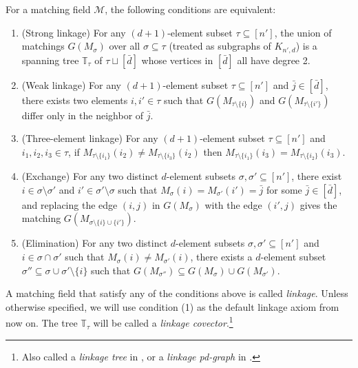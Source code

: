 \documentclass[letterpaper,reqno,11pt]{amsart}
\begin{document}
\begin{theorem}\label{thm:linkageequiv}
    For a matching field $\mathcal{M}$, the following conditions are equivalent: \begin{enumerate}
        \item \textnormal{(Strong linkage)} For any $(d+1)$-element subset $\tau\subseteq [n']$, the union of matchings $G(M_\sigma)$ over all $\sigma\subseteq \tau$ (treated as subgraphs of $K_{n', d}$) is a spanning tree $\mathbb{T}_{\tau}$ of $\tau \sqcup [\bar{d}]$ whose vertices in $[\bar{d}]$ all have degree 2.
        \item \textnormal{(Weak linkage)} For any $(d+1)$-element subset $\tau\subseteq [n']$ and $\bar{j}\in [\bar{d}]$, there exists two elements $i, i'\in \tau$ such that $G(M_{\tau\setminus \{i\}})$ and $G(M_{\tau\setminus \{i'\}})$ differ only in the neighbor of $\bar{j}$.
        \item \textnormal{(Three-element linkage)} For any $(d+1)$-element subset $\tau\subseteq [n']$ and $i_1, i_2, i_3\in \tau$, if $M_{\tau\setminus\{i_1\}}(i_2) \neq M_{\tau\setminus\{i_3\}}(i_2)$ then $M_{\tau\setminus\{i_1\}}(i_3) = M_{\tau\setminus\{i_2\}}(i_3)$.
        \item \textnormal{(Exchange)} For any two distinct $d$-element subsets $\sigma, \sigma'\subseteq [n']$, there exist $i\in \sigma\setminus\sigma'$ and $i'\in \sigma'\setminus \sigma$ such that $M_{\sigma}(i) = M_{\sigma'}(i') = \bar{j}$ for some $\bar{j}\in [\bar{d}]$, and replacing the edge $(i, j)$ in $G(M_\sigma)$ with the edge $(i', j)$ gives the matching $G(M_{\sigma\setminus\{i\}\cup \{i'\}})$.
        \item \textnormal{(Elimination)} For any two distinct $d$-element subsets $\sigma, \sigma'\subseteq [n']$ and $i\in \sigma\cap \sigma'$ such that $M_{\sigma}(i)\neq M_{\sigma'}(i)$, there exists a $d$-element subset $\sigma'' \subseteq \sigma \cup\sigma' \setminus \{i\}$ such that $G(M_{\sigma''}) \subseteq G(M_{\sigma}) \cup G(M_{\sigma'})$.
    \end{enumerate}
\end{theorem}

A matching field that satisfy any of the conditions above is called \emph{linkage}. Unless otherwise specified, we will use condition (1) as the default linkage axiom from now on. The tree $\mathbb{T}_{\tau}$ will be called a \emph{linkage covector}.\footnote{Also called a \emph{linkage tree} in \cite{MaxMinors}, or a \emph{linkage pd-graph} in \cite{TropicalToOM}.}
\end{document}
